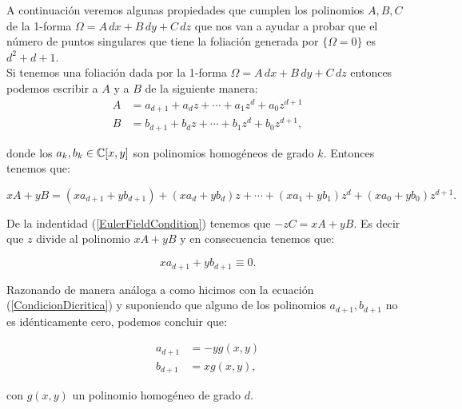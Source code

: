 A continuación veremos algunas propiedades que cumplen los polinomios $A,B,C$ de la 1-forma $\Omega=A\, dx+B\, dy+C\, dz$ que nos van a ayudar a probar que el número de puntos singulares que tiene la foliación generada por $\{ \Omega=0\}$ es $d^{2}+d+1$.\\

Si tenemos una foliación dada por la 1-forma $\Omega=A\, dx+B\, dy+C\, dz$ entonces podemos escribir a $A$ y a $B$ de la siguiente manera:
\begin{equation}
\label{CoeficientesRespectoAz}
\begin{aligned}
A &=a_{d+1}+a_{d}z+\cdots+a_{1}z^{d}+a_{0}z^{d+1}\\
B &=b_{d+1}+b_{d}z+\cdots+b_{1}z^{d}+b_{0}z^{d+1},
\end{aligned}
\end{equation}

\noindent donde los $a_{k},b_{k}\in\mathbb{C}[x,y]$ son polinomios homogéneos de grado $k$. Entonces tenemos que:

\begin{equation}
xA+yB = (xa_{d+1}+yb_{d+1})+(xa_{d}+yb_{d})z+\cdots+(xa_{1}+yb_{1})z^{d}+(xa_{0}+yb_{0})z^{d+1}.
\end{equation}

\noindent De la indentidad (\ref{EulerFieldCondition}) tenemos que $-zC=xA+yB$. Es decir que $z$ divide al polinomio $xA+yB$ y en consecuencia tenemos que:

\begin{equation}
\label{CondicionImportante}
 xa_{d+1}+yb_{d+1}\equiv 0.
\end{equation}

\noindent Razonando de manera análoga a como hicimos con la ecuación (\ref{CondicionDicritica}) y suponiendo que alguno de los polinomios $a_{d+1},b_{d+1}$ no es idénticamente cero, podemos concluir que:

\begin{equation} 
\begin{aligned}
\label{RadialHomogeneo}
a_{d+1} &= -yg(x,y)\\
b_{d+1} &= xg(x,y),
\end{aligned}
\end{equation}

\noindent con $g(x,y)$ un polinomio homogéneo de grado $d$.\\ %


